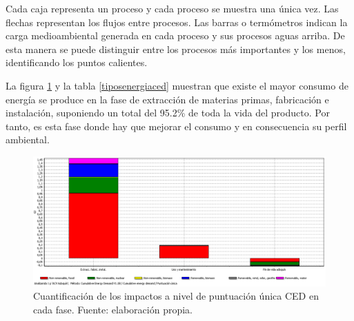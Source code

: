 Cada caja representa un proceso y cada proceso se muestra una única vez. Las flechas representan los flujos entre procesos. Las barras o termómetros indican la carga medioambiental generada en cada proceso y sus procesos aguas arriba. De esta manera se puede distinguir entre los procesos más importantes y los menos, identificando los puntos calientes.

La figura \ref{fig:ced_puntuacionunica} y la tabla \ref{tiposenergiaced} muestran que existe el mayor consumo de energía se produce en la fase de extracción de materias primas, fabricación e instalación, suponiendo un total del 95.2\% de toda la vida del producto. Por tanto, es esta fase donde hay que mejorar el consumo y en consecuencia su perfil ambiental.

\begin{figure}[!htbp]
\centering
\includegraphics[width=15cm]{img/ced_puntuacionunica.png}
\caption[Cuantificación de los impactos a nivel de puntuación única CED en cada fase.]{Cuantificación de los impactos a nivel de puntuación única CED en cada fase. Fuente: elaboración propia.}
\label{fig:ced_puntuacionunica}
\end{figure}

